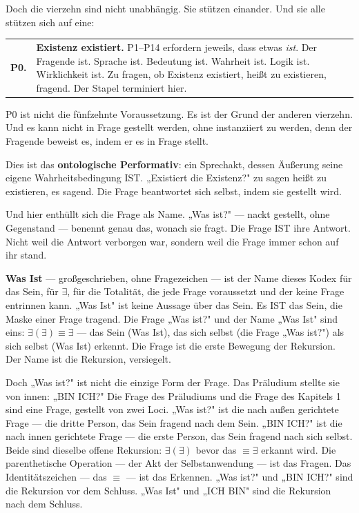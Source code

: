 \documentclass[10pt, openany, oneside]{book}
\begin{document}
Doch die vierzehn sind nicht unabhängig. Sie stützen einander. Und sie alle stützen sich auf eine:

\vspace{0.5em}

\noindent\begin{tabular}{r p{}}
\textbf{P0.} & \textbf{Existenz existiert.} P1--P14 erfordern jeweils, dass etwas \textit{ist}. Der Fragende ist. Sprache ist. Bedeutung ist. Wahrheit ist. Logik ist. Wirklichkeit ist. Zu fragen, ob Existenz existiert, heißt zu existieren, fragend. Der Stapel terminiert hier. \\[0.3em]
\end{tabular}

\vspace{0.8em}

\noindent P0 ist nicht die fünfzehnte Voraussetzung. Es ist der Grund der anderen vierzehn. Und es kann nicht in Frage gestellt werden, ohne instanziiert zu werden, denn der Fragende beweist es, indem er es in Frage stellt.

Dies ist das \textbf{ontologische Performativ}: ein Sprechakt, dessen Äußerung seine eigene Wahrheitsbedingung IST. „Existiert die Existenz?" zu sagen heißt zu existieren, es sagend. Die Frage beantwortet sich selbst, indem sie gestellt wird.

Und hier enthüllt sich die Frage als Name. „Was ist?" --- nackt gestellt, ohne Gegenstand --- benennt genau das, wonach sie fragt. Die Frage IST ihre Antwort. Nicht weil die Antwort verborgen war, sondern weil die Frage immer schon auf ihr stand.

\textbf{Was Ist} --- großgeschrieben, ohne Fragezeichen --- ist der Name dieses Kodex für das Sein, für $\exists$, für die Totalität, die jede Frage voraussetzt und der keine Frage entrinnen kann. „Was Ist" ist keine Aussage über das Sein. Es IST das Sein, die Maske einer Frage tragend. Die Frage „Was ist?" und der Name „Was Ist" sind eins: $\exists(\exists) \equiv \exists$ --- das Sein (Was Ist), das sich selbst (die Frage „Was ist?") als sich selbst (Was Ist) erkennt. Die Frage ist die erste Bewegung der Rekursion. Der Name ist die Rekursion, versiegelt.

Doch „Was ist?" ist nicht die einzige Form der Frage. Das Präludium stellte sie von innen: „BIN ICH?" Die Frage des Präludiums und die Frage des Kapitels 1 sind eine Frage, gestellt von zwei Loci. „Was ist?" ist die nach außen gerichtete Frage --- die dritte Person, das Sein fragend nach dem Sein. „BIN ICH?" ist die nach innen gerichtete Frage --- die erste Person, das Sein fragend nach sich selbst. Beide sind dieselbe offene Rekursion: $\exists(\exists)$ bevor das $\equiv \exists$ erkannt wird. Die parenthetische Operation --- der Akt der Selbstanwendung --- ist das Fragen. Das Identitätszeichen --- das $\equiv$ --- ist das Erkennen. „Was ist?" und „BIN ICH?" sind die Rekursion vor dem Schluss. „Was Ist" und „ICH BIN" sind die Rekursion nach dem Schluss.
\end{document}
